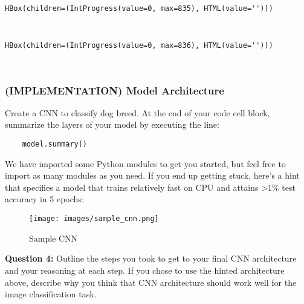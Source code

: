 \documentclass[11pt]{article}
\makeatletter
\def\maxwidth{\ifdim\Gin@nat@width>\linewidth\linewidth
    \else\Gin@nat@width\fi}
\let\Oldincludegraphics\includegraphics
\renewcommand{\includegraphics}[1]{\Oldincludegraphics[width=.8\maxwidth]{#1}}
\makeatother
\begin{document}
    
    \begin{verbatim}
HBox(children=(IntProgress(value=0, max=835), HTML(value='')))
    \end{verbatim}

    
    \begin{Verbatim}[commandchars=\\\{\}]


    \end{Verbatim}

    
    \begin{verbatim}
HBox(children=(IntProgress(value=0, max=836), HTML(value='')))
    \end{verbatim}

    
    \begin{Verbatim}[commandchars=\\\{\}]


    \end{Verbatim}

    \subsubsection{(IMPLEMENTATION) Model
Architecture}\label{implementation-model-architecture}

Create a CNN to classify dog breed. At the end of your code cell block,
summarize the layers of your model by executing the line:

\begin{verbatim}
    model.summary()
\end{verbatim}

We have imported some Python modules to get you started, but feel free
to import as many modules as you need. If you end up getting stuck,
here's a hint that specifies a model that trains relatively fast on CPU
and attains \textgreater{}1\% test accuracy in 5 epochs:

\begin{figure}
\centering
\texttt{[image: images/sample\_cnn.png]}
\caption{Sample CNN}
\end{figure}

\textbf{Question 4:} Outline the steps you took to get to your final CNN
architecture and your reasoning at each step. If you chose to use the
hinted architecture above, describe why you think that CNN architecture
should work well for the image classification task.
\end{document}
